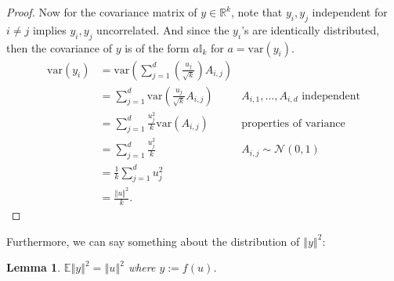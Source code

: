 \documentclass{article}
\newtheorem{lemma}{Lemma}
\begin{document}
\begin{proof}
    Now for the covariance matrix of $y \in \mathbb{R}^k$, note that $y_i, y_j$ independent for $i \neq j$ implies $y_i, y_j$ uncorrelated. And since the $y_i$'s are identically distributed, then the covariance of $y$ is of the form $a\mathbb{I}_k$ for $a = \text{var}(y_i)$.
    \begin{align*}
        \text{var}(y_i) &= \text{var} \left( \sum_{j=1}^d \left(\frac{u_j}{\sqrt{k}} \right) A_{i,j} \right)\\
                        &= \sum_{j=1}^d \text{var} \left(\frac{u_j}{\sqrt{k}}A_{i,j} \right) &\text{$A_{i,1}, \ldots, A_{i,d}$ independent}\\
                        &= \sum_{j=1}^d \frac{u_j^2}{k} \text{var} \left(A_{i,j} \right) &\text{properties of variance}\\
                        &= \sum_{j=1}^d \frac{u_j^2}{k} &A_{i,j} \sim \mathcal{N}(0,1)\\
                        &= \frac{1}{k} \sum_{j=1}^d u_j^2\\
                        &= \frac{\left \Vert u \right \Vert^2}{k}.
    \end{align*}
    \end{proof}
    
     Furthermore, we can say something about the distribution of $\left\Vert y \right\Vert^2$:
     \begin{lemma}
     $\mathbb{E} \left\Vert y \right\Vert^2 = \left\Vert u \right\Vert^2$ where $y:= f(u)$.
     \end{lemma}
     
\end{document}
